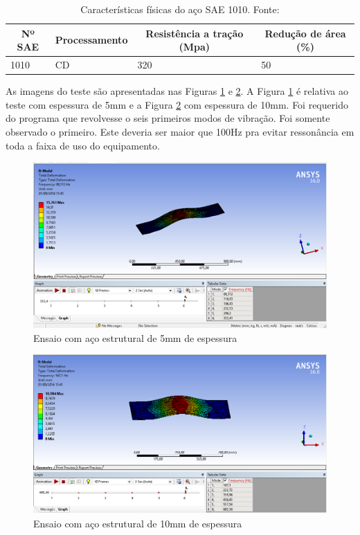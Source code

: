 \begin{table}[!h]
\centering
\caption{Características físicas do aço SAE 1010. Fonte: \cite{shigley}}
\label{tab:caracteristicas_aco}
\begin{tabular}{|l|l|l|l|}
\hline
\multicolumn{1}{|c|}{\textbf{Nº SAE}} & \multicolumn{1}{c|}{\textbf{Processamento}} & \multicolumn{1}{c|}{\textbf{Resistência a tração (Mpa)}} & \multicolumn{1}{c|}{\textbf{Redução de área (\%)}} \\ \hline
1010                                  & CD                                          & 320                                                      & 50                                                 \\ \hline
\end{tabular}
\end{table}

As imagens do teste são apresentadas nas Figuras \ref{fig:analise_1} e \ref{fig:analise_2}. A Figura \ref{fig:analise_1} é relativa ao teste com espessura de 5mm e a Figura \ref{fig:analise_2} com espessura de 10mm. Foi requerido do programa que revolvesse o seis primeiros modos de vibração. Foi somente observado o primeiro. Este deveria ser maior que 100Hz pra evitar ressonância em toda a faixa de uso do equipamento.

\begin{figure}[!ht]
\centering
\includegraphics[scale=1]{figuras/analise_1.png}
\caption{Ensaio com aço estrutural de 5mm de espessura}
\label{fig:analise_1}
\end{figure}

\begin{figure}[!ht]
\centering
\includegraphics[scale=0.5]{figuras/analise_2.png}
\caption{Ensaio com aço estrutural de 10mm de espessura}
\label{fig:analise_2}
\end{figure}


